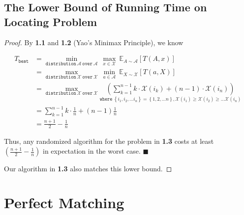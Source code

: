 \documentclass{article}
\renewcommand{\qedsymbol}{\hfill $\blacksquare$\par}
\newcommand{\set}[1]{\left\{#1\right\}}
\newcommand{\staExp}[2]{\mathbb{E}_{#1}\left[#2\right]}
\begin{document}
\subsection{The Lower Bound of Running Time on Locating Problem}
\vspace{1em}
\begin{proof}
    By \textbf{1.1} and \textbf{1.2} (Yao's Minimax Principle), we know
    
    \vspace{-2.5em}
    \begin{align*}
        T_{\mathtt{best}} &= \underset{\mathtt{distribution}\ \mathscr{A}\mathtt{\ over\ }\mathcal{A}}{\min}\ \underset{x\in\mathcal{X}}{\max}\ \staExp{A\sim\mathscr{A}}{T(A,x)} \\
        &= \underset{\mathtt{distribution\ }\mathscr{X}\mathtt{\ over\ }\mathcal{X}}{\max}\ \underset{a\in \mathcal{A}}{\min}\ \staExp{X\sim\mathscr{X}}{T(a,X)} \\
        &= \underset{\mathtt{distribution\ }\mathscr{X}\mathtt{\ over\ }\mathcal{X}}{\max}\underset{\mathtt{where\ }\set{i_1,i_2,...i_n}=\set{1,2,...n},\mathscr{X}(i_1)\geq\mathscr{X}(i_2)\geq...\mathscr{X}(i_n)}{\left(\sum_{k=1}^{n-1}k\cdot\mathscr{X}(i_k)+(n-1)\cdot\mathscr{X}(i_n)\right)} \\
        &= \sum_{k=1}^{n-1}k\cdot\frac{1}{n} + (n-1)\frac{1}{n} \\
        &= \frac{n+1}{2}-\frac{1}{n}
    \end{align*}
    
    \hspace{1.3em}
    Thus, any randomized algorithm for the problem in \textbf{1.3} costs at least $\left(\frac{n+1}{2}-\frac{1}{n}\right)$ in expectation in the worst case. \qedsymbol
    
    \hspace{1.3em}
    Our algorithm in \textbf{1.3} also matches this lower bound.
\end{proof}

\vspace{1em}
\section{Perfect Matching}
\vspace{1em}
\end{document}

